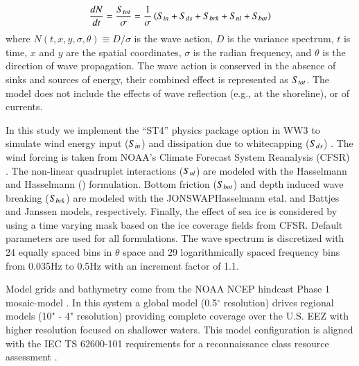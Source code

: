 \begin{align}
  \frac{d N}{d t} = \frac{S_{ tot }}{\sigma} = \frac{1}{\sigma}\left ( S_{ in } + S_{ ds } + S_{ brk } + S_{ nl } + S_{ bot } \right )
  \label{eqn:actionbalance}
\end{align}
where $N(t,x,y,\sigma,\theta) \equiv D/\sigma$ is the wave action, $D$ is the variance spectrum, $t$ is time, $x$ and $y$ are the spatial coordinates, $\sigma$ is the radian frequency, and $\theta$ is the direction of wave propagation.
The wave action is conserved in the absence of sinks and sources of energy, their combined effect is represented as $S_{ tot }$. The model \DIFdelbegin {}\DIFdelend does not include the effects of wave reflection (e.g., at the shoreline), or of currents.

In this study we implement the ``ST4'' physics package option in WW3 to simulate wind energy input ($S_{ in }$) and dissipation due to whitecapping ($S_{ ds }$) \citep{ardhuinObservationSwellDissipation2009}.
The wind forcing is taken from NOAA's Climate Forecast System Reanalysis (CFSR) \citep{sahaNCEPClimateForecast2010}. The non-linear quadruplet interactions ($S_{ nl }$) are modeled with the Hasselmann and Hasselmann (\citeyear{hasselmannComputationsParameterizationsNonlinear1985}) formulation. Bottom friction ($S_{ bot }$) and depth induced wave breaking ($S_{ brk }$) are modeled with the JONSWAP\DIFaddbegin \DIFadd{, }\DIFaddend Hasselmann etal. \citeyear{hasselmannMeasurementsWindwaveGrowth1973}\DIFaddbegin \DIFadd{, }\DIFaddend and Battjes and Janssen \citeyear{battjesEnergyLossSetup1978} models, respectively. Finally, the effect of sea ice is considered by using a time varying mask based on the ice coverage fields from CFSR. Default parameters are used for all formulations. The wave spectrum is discretized with 24 equally spaced bins in $\theta$ space and 29 logarithmically spaced frequency bins from 0.035Hz to 0.5Hz with an increment factor of 1.1.

Model grids and bathymetry come from the NOAA NCEP hindcast Phase 1 mosaic-model \citep{chawla2011wavewatch,chawla201230}. In this system a global model (0.5$^{\circ}$ resolution) drives regional models (10" - 4" resolution) providing complete coverage over the U.S. EEZ with higher resolution focused on shallower waters. This model configuration is \DIFaddbegin {}\DIFaddend aligned with the IEC TS 62600-101 requirements for a reconnaissance class resource assessment \citep{internationalelectrotechnicalcommissionPart101Wave2015}.

